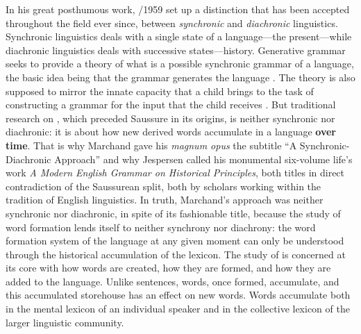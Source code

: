 \documentclass[output=paper]{langsci/langscibook}
\begin{document}
In his great posthumous work, %
\citealt{Saussure16}/1959 %
%
set up a distinction
that has been accepted throughout the field ever since, between
\emph{synchronic} and \emph{diachronic} linguistics. Synchronic
linguistics deals with a single state of a language---the
present---while diachronic linguistics deals with successive
states---history. Generative grammar seeks to provide a theory of what
is a possible synchronic grammar of a language, the basic idea being
that the grammar generates the language %
\citep{Chomsky1957}%
%
. The theory is
also supposed to mirror the innate capacity that a child brings to the
task of constructing a grammar for the input that the child receives
%
\citep{Chomsky1965}%
%
. But traditional research on , which
preceded Saussure in its origins, is neither synchronic nor diachronic:
it is about how new derived words accumulate in a language \textbf{over
time}. That is why Mar\-chand gave his \emph{magnum opus} the subtitle ``A
Synchronic-Diachronic Approach'' and why Jespersen called his monumental
six-volume life's work \emph{A Modern English Grammar on Historical
Principles}, both titles in direct contradiction of the Saussurean
split, both by scholars working within the tradition of English
linguistics. In truth, Marchand's approach was neither synchronic nor
diachronic, in spite of its fashionable title, because the study of word
formation lends itself to neither synchrony nor diachrony: the word
formation system of the language at any given moment can only be
understood through the historical accumulation of the lexicon. The study
of  is concerned at its core with how words are created,
how they are formed, and how they are added to the language. Unlike
sentences, words, once formed, accumulate, and this accumulated
storehouse has an effect on new words. Words accumulate both in the
mental lexicon of an individual speaker and in the collective lexicon of
the larger linguistic community.
\end{document}
